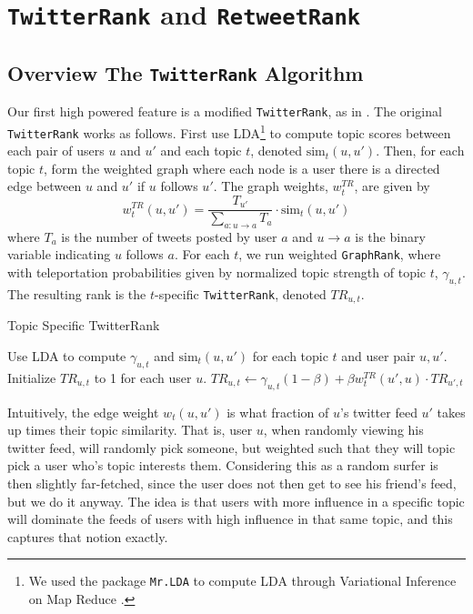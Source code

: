 \section{\texttt{TwitterRank} and \texttt{RetweetRank}}

\subsection{Overview The \texttt{TwitterRank} Algorithm}

Our first high powered feature is a modified \texttt{TwitterRank}, as in \cite{Weng:2010:TFT:1718487.1718520}.
The original \texttt{TwitterRank} works as follows.  
First use LDA\footnote{We used the package \texttt{Mr.LDA} to compute LDA through Variational Inference on Map Reduce \cite{conf/www/ZhaiBAA12}.} to compute topic scores between each pair of users $u$ and $u'$ and each topic $t$, denoted $\mbox{sim}_t(u,u')$.
Then, for each topic $t$, form the weighted graph where each node is a user there is a directed edge between $u$ and $u'$ if $u$ follows $u'$.
The graph weights, $w^{TR}_t$, are given by
\begin{equation}\label{eq:treq}
w^{TR}_t(u,u') = \frac{T_{u'}}{\sum_{a:u\to a}T_{a}}\cdot \mbox{sim}_t(u,u')
\end{equation}
where $T_{a}$ is the number of tweets posted by user $a$ and $u\to a$ is the binary variable indicating $u$ follows $a$.  
For each $t$, we run weighted \texttt{GraphRank}, where with teleportation probabilities given by normalized topic strength of topic $t$, $\gamma_{u,t}$.   
The resulting rank is the $t$-specific \texttt{TwitterRank}, denoted $TR_{u,t}$.  

\begin{algorithm}
  \caption{Topic Specific TwitterRank}
  \label{alg:tralg}

  \begin{algorithmic}
    \State Use LDA to compute $\gamma_{u,t}$ and $\mbox{sim}_t(u,u')$ for each topic $t$ and user pair $u,u'$.  
    \State Initialize $TR_{u,t}$ to 1 for each user $u$.
    \State $TR_{u,t}\gets \gamma_{u,t}(1-\beta) + \beta w^{TR}_t(u',u)\cdot TR_{u',t}$
    \EndFor
    \EndWhile
    \EndFor
  \end{algorithmic}
\end{algorithm}


Intuitively, the edge weight $w_t(u,u')$ is what fraction of $u$'s twitter feed $u'$ takes up times their topic similarity.
That is, user $u$, when randomly viewing his twitter feed, will randomly pick someone, but weighted such that they will topic pick a user who's topic interests them.  
Considering this as a random surfer is then slightly far-fetched, since the user does not then get to see his friend's feed, but we do it anyway.  
The idea is that users with more influence in a specific topic will dominate the feeds of users with high influence in that same topic, and this captures that notion exactly.

